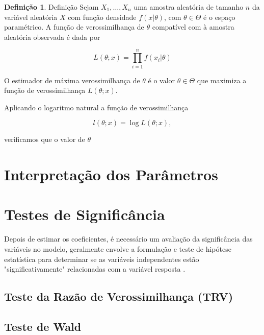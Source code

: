 \documentclass[
	12pt,				%
	openright,			%
	oneside,      %
	a4paper,			%
	english,			%
	french,				%
	spanish,			%
	brazil,				%
	]{abntex2}\usepackage[]{graphicx}\usepackage[table]{xcolor}
\theoremstyle{definition}
\newtheorem{definition}{Definição}[section]
\begin{document}
\begin{definition}{Definição}
    Sejam $X_1,\ldots,X_n$ uma amostra aleatória de tamanho $n$ da variável aleatória $X$ com função densidade $f(x|\theta)$, com $\theta \in \Theta$ é o espaço paramétrico. A função de verossimilhança de $\theta$ compatível com à amostra aleatória observada é dada por 
\end{definition}

\begin{equation}
    L(\theta;x) = \prod_{i = 1}^{n}f(x_i|\theta)
\end{equation}

O estimador de máxima verossimilhança de $\theta$ é o valor $\theta \in \Theta$ que maximiza a função de verossimilhança $L(\theta;x)$. 

Aplicando o logaritmo natural a função de verossimilhança

\begin{equation}
    l(\theta;x) = \log L(\theta;x),
\end{equation}

\noindent verificamos que o valor de $\theta$
    



    \section{Interpretação dos Parâmetros}






    \section{Testes de Significância}
    
Depois de estimar os coeficientes, é necessário um avaliação da significância das variáveis no modelo, geralmente envolve a formulação e teste de hipótese estatística para determinar se as variáveis independentes estão "significativamente" relacionadas com a variável resposta \cite{hosmer2013applied}.
      
      \subsection{Teste da Razão de Verossimilhança (TRV)}
      
      
      

        
        
      \subsection{Teste de Wald}
      
\end{document}
